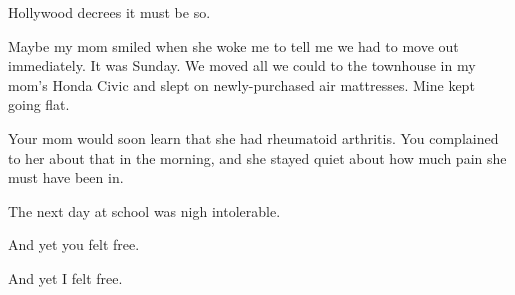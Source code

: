 \begin{ally}
Hollywood decrees it must be so.
\end{ally}
Maybe my mom smiled when she woke me to tell me we had to move out immediately. It was Sunday. We moved all we could to the townhouse in my mom's Honda Civic and slept on newly-purchased air mattresses. Mine kept going flat.

\begin{ally}
Your mom would soon learn that she had rheumatoid arthritis. You complained to her about that in the morning, and she stayed quiet about how much pain she must have been in.
\end{ally}
The next day at school was nigh intolerable.

\begin{ally}
And yet you felt free.
\end{ally}
And yet I felt free.
\newpage
